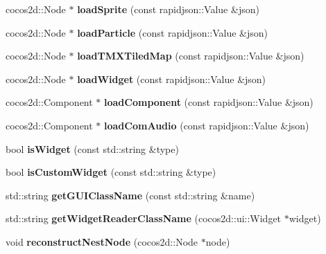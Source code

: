 \begin{DoxyCompactItemize}
\mbox{\label{classCSLoader_a339e7424a0c664531e064f81ba71c1f7}} 
cocos2d\+::\+Node $\ast$ {\bfseries load\+Sprite} (const rapidjson\+::\+Value \&json)
\item 
\mbox{\label{classCSLoader_a2a7f4e0343dd68e770716e1f33b730f1}} 
cocos2d\+::\+Node $\ast$ {\bfseries load\+Particle} (const rapidjson\+::\+Value \&json)
\item 
\mbox{\label{classCSLoader_acaa94f723eb0263d6d4cd9164008ff28}} 
cocos2d\+::\+Node $\ast$ {\bfseries load\+T\+M\+X\+Tiled\+Map} (const rapidjson\+::\+Value \&json)
\item 
\mbox{\label{classCSLoader_a4a2ecb088689a632a91a9ede73cc369b}} 
cocos2d\+::\+Node $\ast$ {\bfseries load\+Widget} (const rapidjson\+::\+Value \&json)
\item 
\mbox{\label{classCSLoader_a027fcab55fd67163a4b15bbe48e094bb}} 
cocos2d\+::\+Component $\ast$ {\bfseries load\+Component} (const rapidjson\+::\+Value \&json)
\item 
\mbox{\label{classCSLoader_a466ff6d4f66921f75879e42210d3b1fd}} 
cocos2d\+::\+Component $\ast$ {\bfseries load\+Com\+Audio} (const rapidjson\+::\+Value \&json)
\item 
\mbox{\label{classCSLoader_a975912d570a40efb0883ab54c6267e76}} 
bool {\bfseries is\+Widget} (const std\+::string \&type)
\item 
\mbox{\label{classCSLoader_a85ed19243431e55d734eee16ac0c1769}} 
bool {\bfseries is\+Custom\+Widget} (const std\+::string \&type)
\item 
\mbox{\label{classCSLoader_ace50f878e093d8f46577c09eae7c37c4}} 
std\+::string {\bfseries get\+G\+U\+I\+Class\+Name} (const std\+::string \&name)
\item 
\mbox{\label{classCSLoader_a84eb609f499347cb41226fc22bd087fc}} 
std\+::string {\bfseries get\+Widget\+Reader\+Class\+Name} (cocos2d\+::ui\+::\+Widget $\ast$widget)
\item 
\mbox{\label{classCSLoader_a391b7ba4f6c3995e9d34acc6af12fde6}} 
void {\bfseries reconstruct\+Nest\+Node} (cocos2d\+::\+Node $\ast$node)
\end{DoxyCompactItemize}

